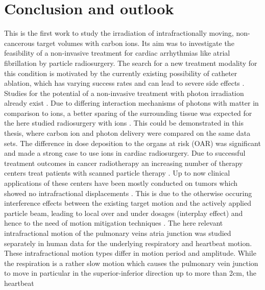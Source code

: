 
\chapter{Conclusion and outlook}

This is the first work to study the irradiation of intrafractionally moving, non-cancerous target volumes with carbon ions. Its aim was to 
investigate the feasibility of a non-invasive treatment for cardiac arrhythmias like atrial fibrillation by 
particle radiosurgery.\newline
\newline
The search for a new treatment modality for this condition is motivated by the currently existing possibility of 
catheter ablation, which has varying success rates and can lead to severe side effects \cite{Cap05, Cap10, Jong05, Her13, Gai10, Med13}. 
Studies for the potential of a non-invasive treatment with photon irradiation already exist \cite{Sha10}. 
Due to differing interaction mechanisms of photons with matter in comparison to ions, a better sparing of the surrounding tissue was 
expected for the here studied radiosurgery with ions \cite{Ber12}. This could be demonstrated in this thesis, where carbon ion and photon delivery were 
compared on the same data sets. The difference in dose deposition to the organs at risk (OAR) was significant and made a strong case to use ions in 
cardiac radiosurgery.\newline  
\newline
Due to successful treatment outcomes in cancer radiotherapy an increasing number of therapy centers treat patients with scanned particle 
therapy \cite{PTCOG13}. Up to now clinical applications of these centers have been mostly conducted on tumors which showed no 
intrafractional displacements \cite{Loe13}. This is due to the otherwise occuring interference effects between the existing target motion and 
the actively applied particle beam, leading to local over and under dosages (interplay effect) and hence to the need of motion mitigation 
techniques \cite{Phi92, Ber08}.\newline
\newline
The here relevant intrafractional motion of the pulmonary veins atria junction was studied separately in human data for the underlying 
respiratory and heartbeat motion. These intrafractional motion types differ in motion period and amplitude. While the respiration is a rather 
slow motion which causes the pulmonary vein junction to move in particular in the superior-inferior direction up to more than 2cm, the heartbeat 
